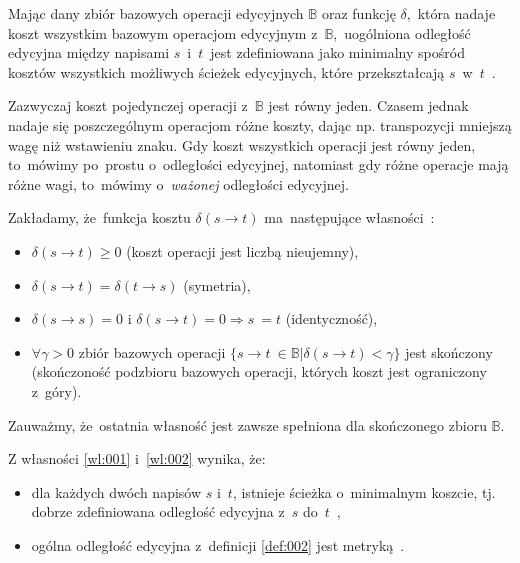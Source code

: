 \documentclass{praca1}
\begin{document}
\begin{definition}\label{def:002}
Mając dany zbiór bazowych operacji edycyjnych $\mathbb{B}$ oraz funkcję $\delta$,~która nadaje koszt wszystkim bazowym operacjom edycyjnym z~$\mathbb{B}$,~uogólniona odległość edycyjna między napisami $s$~i~$t$~jest zdefiniowana jako minimalny spośród kosztów wszystkich możliwych ścieżek edycyjnych, które przekształcają $s$~w~$t$~\cite{Boytsov2011:indexingmethods}.
\end{definition}

Zazwyczaj koszt pojedynczej operacji z~$\mathbb{B}$ jest równy jeden. Czasem jednak nadaje się poszczególnym operacjom różne koszty, dając np. transpozycji mniejszą wagę niż wstawieniu znaku. Gdy koszt wszystkich operacji jest równy jeden, to~mówimy po~prostu o~odległości edycyjnej, natomiast gdy różne operacje mają różne wagi, to~mówimy o~\emph{ważonej} odległości edycyjnej.

\begin{property}\label{wl:002}
Zakładamy, że~funkcja kosztu $\delta(s \rightarrow t)$ ma~następujące własności~\cite{Boytsov2011:indexingmethods}:
\begin{itemize}
\item $\delta(s \rightarrow t) \geq 0$ (koszt operacji jest liczbą nieujemny),
\item $\delta(s \rightarrow t) = \delta(t \rightarrow s)$ (symetria),
\item $\delta(s \rightarrow s) = 0\text{ i~} \delta(s \rightarrow t) = 0 \Rightarrow s~= t$ (identyczność),
\item $\forall \gamma > 0$ zbiór bazowych operacji $\{s \rightarrow t~\in \mathbb{B} | \delta(s \rightarrow t) < \gamma \}$ jest skończony (skończoność podzbioru bazowych operacji, których koszt jest ograniczony z~góry).
\end{itemize}
\end{property}

Zauważmy, że~ostatnia własność jest zawsze spełniona dla skończonego zbioru $\mathbb{B}$.

\begin{theorem}
Z własności \ref{wl:001} i~\ref{wl:002} wynika, że:
\begin{itemize}
\item dla każdych dwóch napisów $s$ i~$t$, istnieje ścieżka o~minimalnym koszcie, tj. dobrze zdefiniowana odległość edycyjna z~$s$ do~$t$~\cite{Boytsov2011:indexingmethods},
\item ogólna odległość edycyjna z~definicji \ref{def:002} jest metryką~\cite{Wagner1974:stringtostring}.
\end{itemize}
\end{theorem}
\end{document}
